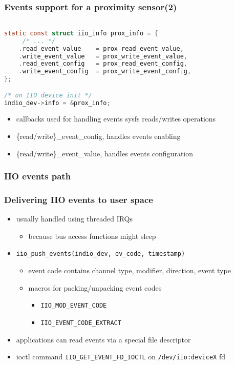 \documentclass[aspectratio=169]{beamer}
\begin{document}
\begin{frame}[fragile]
\frametitle{Events support for a proximity sensor(2)}
\begin{lstlisting}[language=C]

static const struct iio_info prox_info = {
     /* ... */
    .read_event_value    = prox_read_event_value,
    .write_event_value   = prox_write_event_value,
    .read_event_config   = prox_read_event_config,
    .write_event_config  = prox_write_event_config,
};

/* on IIO device init */
indio_dev->info = &prox_info;

\end{lstlisting}
\begin{itemize}
    \item callbacks used for handling events sysfs reads/writes operations
    \item \{read/write\}\_event\_config, handles events enabling
    \item \{read/write\}\_event\_value, handles events configuration
\end{itemize}
\end{frame}


\begin{frame}
\frametitle{IIO events path}
\begin{figure}
\end{figure}
\end{frame}


\begin{frame}
\frametitle{Delivering IIO events to user space}
\begin{itemize}
    \item usually handled using threaded IRQs
    \begin{itemize}
        \item because bus access functions might sleep
    \end{itemize}
    \item \texttt{iio\_push\_events(indio\_dev, ev\_code, timestamp)}
    \begin{itemize}
        \item event code contains channel type, modifier, direction, event type
        \item macros for packing/unpacking event codes
        \begin{itemize}
            \item \texttt{IIO\_MOD\_EVENT\_CODE}
            \item \texttt{IIO\_EVENT\_CODE\_EXTRACT}
        \end{itemize}
    \end{itemize}
    \item applications can read events via a special file descriptor
    \item ioctl command \texttt{IIO\_GET\_EVENT\_FD\_IOCTL} on \texttt{/dev/iio:deviceX} fd
\end{itemize}
\end{frame}
\end{document}
